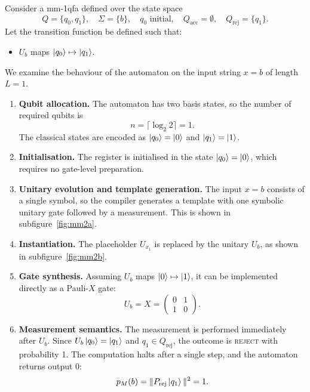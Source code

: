 \begin{example}[Early Rejection on $x = b$] \label{ex:mmqfa-early-reject}
Consider a \gls{mm-1qfa} defined over the state space
\[
Q = \{q_0, q_1\}, \quad \Sigma = \{b\}, \quad q_0 \text{ initial}, \quad Q_{\text{acc}} = \emptyset, \quad Q_{\text{rej}} = \{q_1\}.
\]
Let the transition function be defined such that:
\begin{itemize}
  \item $U_b$ maps $\ket{q_0} \mapsto \ket{q_1}$.
\end{itemize}
We examine the behaviour of the automaton on the input string $x = b$ of length $L = 1$.

\begin{enumerate}
  \item \textbf{Qubit allocation.} The automaton has two basis states, so the number of required qubits is
  \[
  n = \lceil \log_2 2 \rceil = 1.
  \]
  The classical states are encoded as $\ket{q_0} = \ket{0}$ and $\ket{q_1} = \ket{1}$.

  \item \textbf{Initialisation.} The register is initialised in the state $\ket{q_0} = \ket{0}$, which requires no gate-level preparation.

  \item \textbf{Unitary evolution and template generation.} The input $x = b$ consists of a single symbol, so the compiler generates a template with one symbolic unitary gate followed by a measurement. This is shown in subfigure~\ref{fig:mm2a}.

  \item \textbf{Instantiation.} The placeholder $U_{x_1}$ is replaced by the unitary $U_b$, as shown in subfigure~\ref{fig:mm2b}.

  \item \textbf{Gate synthesis.} Assuming $U_b$ maps $\ket{0} \mapsto \ket{1}$, it can be implemented directly as a Pauli-$X$ gate:
  \[
  U_b = X = 
  \begin{pmatrix}
  0 & 1 \\
  1 & 0
  \end{pmatrix}.
  \]

  \item \textbf{Measurement semantics.} The measurement is performed immediately after $U_b$. Since $U_b \ket{q_0} = \ket{q_1}$ and $q_1 \in Q_{\text{rej}}$, the outcome is \textsc{reject} with probability 1. The computation halts after a single step, and the automaton returns output $0$:
  \[
  p_M(b) = \|P_{\text{rej}} \ket{q_1}\|^2 = 1.
  \]
\end{enumerate}


\end{example}
